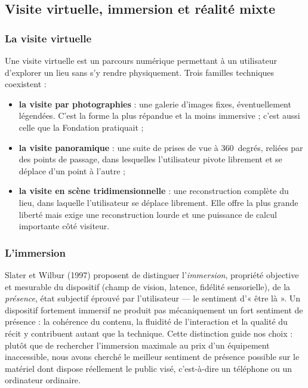 \subsection{Visite virtuelle, immersion et réalité mixte}

\subsubsection{La visite virtuelle}

Une visite virtuelle est un parcours numérique permettant à un utilisateur
d'explorer un lieu sans s'y rendre physiquement. Trois familles techniques
coexistent :

\begin{itemize}
  \item \textbf{la visite par photographies} : une galerie d'images fixes,
        éventuellement légendées. C'est la forme la plus répandue et la moins
        immersive ; c'est aussi celle que la Fondation pratiquait ;
  \item \textbf{la visite panoramique} : une suite de prises de vue à
        360~degrés, reliées par des points de passage, dans lesquelles
        l'utilisateur pivote librement et se déplace d'un point à l'autre ;
  \item \textbf{la visite en scène tridimensionnelle} : une reconstruction
        complète du lieu, dans laquelle l'utilisateur se déplace librement.
        Elle offre la plus grande liberté mais exige une reconstruction lourde
        et une puissance de calcul importante côté visiteur.
\end{itemize}

\subsubsection{L'immersion}

Slater et Wilbur (1997) proposent de distinguer l'\emph{immersion}, propriété
objective et mesurable du dispositif (champ de vision, latence, fidélité
sensorielle), de la \emph{présence}, état subjectif éprouvé par l'utilisateur
— le sentiment d'« être là ». Un dispositif fortement immersif ne produit pas
mécaniquement un fort sentiment de présence : la cohérence du contenu, la
fluidité de l'interaction et la qualité du récit y contribuent autant que la
technique. Cette distinction guide nos choix : plutôt que de rechercher
l'immersion maximale au prix d'un équipement inaccessible, nous avons cherché le
meilleur sentiment de présence possible sur le matériel dont dispose réellement
le public visé, c'est-à-dire un téléphone ou un ordinateur ordinaire.

